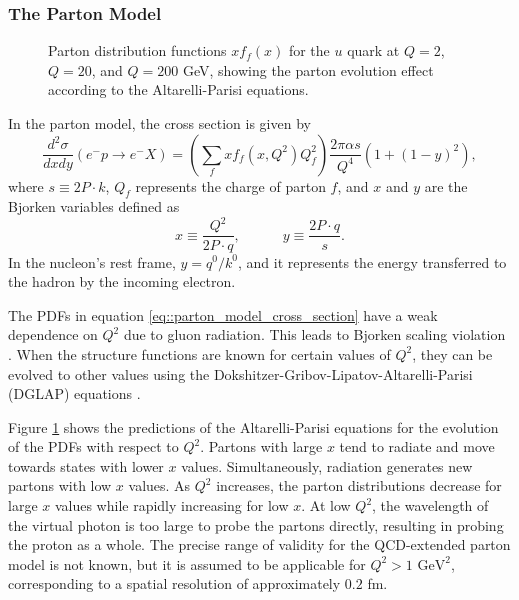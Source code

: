 \subsubsection{The Parton Model}
\label{10.12::parton_model}
    \begin{figure}[t!]
        \centering
        \caption[$Q^2$ dependence of $x$ PDF for the $u$ quark.]{Parton distribution functions $xf_f(x)$ for the $u$ quark at $Q = 2$, $Q = 20$, and $Q = 200$ GeV, showing the parton evolution effect according to the Altarelli-Parisi equations.} %
        \label{fig::q2dependenceu}
    \end{figure}

    In the parton model, the cross section is given by
    \begin{equation}
        \label{eq::parton_model_cross_section}
        \frac{d^2\sigma}{dxdy} \left( e^-p \rightarrow e^-X \right) =
                \left( \sum_f xf_f \left( x, Q^2 \right) Q_f^2 \right)
                \frac{2\pi\alpha s}{Q^4} \left( 1 + \left( 1 - y \right)^2 \right),
    \end{equation}
    where $s \equiv 2P\cdot k$, $Q_f$ represents the charge of parton $f$, and $x$ and $y$ are the Bjorken variables defined as
    \begin{equation*}
        x \equiv \frac{Q^2}{2P\cdot q}, \hspace{36pt} y \equiv \frac{2 P\cdot q}{s}.
    \end{equation*}
    In the nucleon's rest frame, $y = q^0/k^0$, and it represents the energy transferred to the hadron by the incoming electron.

    The PDFs in equation \eqref{eq::parton_model_cross_section} have a weak dependence on $Q^2$ due to gluon radiation.
    This leads to Bjorken scaling violation \cite{halzen1991}.
    When the structure functions are known for certain values of $Q^2$, they can be evolved to other values using the Dokshitzer-Gribov-Lipatov-Altarelli-Parisi (DGLAP) equations \cite{dokshitzer1991}.

    Figure \ref{fig::q2dependenceu} shows the predictions of the Altarelli-Parisi equations for the evolution of the PDFs with respect to $Q^2$.
    Partons with large $x$ tend to radiate and move towards states with lower $x$ values.
    Simultaneously, radiation generates new partons with low $x$ values.
    As $Q^2$ increases, the parton distributions decrease for large $x$ values while rapidly increasing for low $x$.
    At low $Q^2$, the wavelength of the virtual photon is too large to probe the partons directly, resulting in probing the proton as a whole.
    The precise range of validity for the QCD-extended parton model is not known, but it is assumed to be applicable for $Q^2 > 1 \text{ GeV}^2$, corresponding to a spatial resolution of approximately $0.2$ fm.
